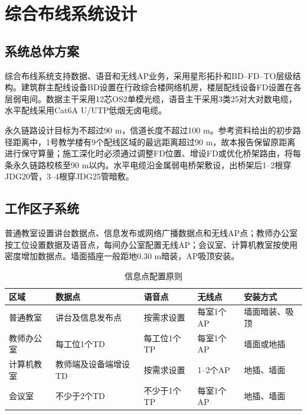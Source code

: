 \documentclass[UTF8,zihao=-4,openany]{ctexrep}
\begin{document}
\chapter{综合布线系统设计}
\section{系统总体方案}
综合布线系统支持数据、语音和无线AP业务，采用星形拓扑和BD--FD--TO层级结构。建筑群主配线设备BD设置在行政综合楼网络机房，楼层配线设备FD设置在各层弱电间。数据主干采用12芯OS2单模光缆，语音主干采用3类25对大对数电缆，水平配线采用Cat6A U/UTP低烟无卤电缆。

永久链路设计目标为不超过90 m，信道长度不超过100 m。参考资料给出的初步路径距离中，1号教学楼有9个配线区域的最远距离超过90 m，故本报告保留原距离进行保守算量；施工深化时必须通过调整FD位置、增设FD或优化桥架路由，将每条永久链路校核至90 m以内。水平电缆沿金属弱电桥架敷设，出桥架后1--2根穿JDG20管，3--4根穿JDG25管暗敷。

\section{工作区子系统}
普通教室设置讲台数据点、信息发布或网络广播数据点和无线AP点；教师办公室按工位设置数据及语音点，每间办公室配置无线AP；会议室、计算机教室按使用密度增加数据点。墙面插座一般距地0.30 m暗装，AP吸顶安装。

\begin{table}[H]
\centering
\caption{信息点配置原则}
\begin{tabularx}{\textwidth}{lXXXl}
\toprule
区域&数据点&语音点&无线点&安装方式\\
\midrule
普通教室&讲台及信息发布点&按需求设置&每室1个AP&墙面暗装、吸顶\\
教师办公室&每工位1个TD&每工位1个TP&每室1个AP&墙面或地插\\
计算机教室&教师端及设备端增设TD&按需求设置&1--2个AP&地插、墙面\\
会议室&不少于2个TD&不少于1个TP&每室1个AP&地插、墙面\\
\bottomrule
\end{tabularx}
\end{table}
\end{document}
